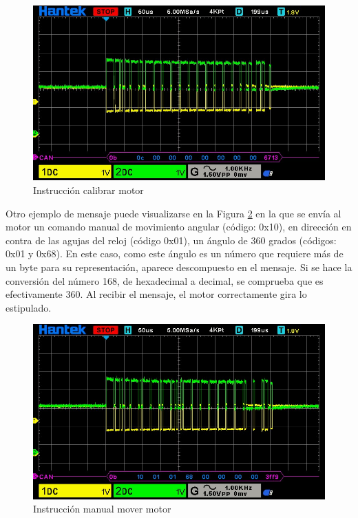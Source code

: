 \begin{figure}[htbp]
	\centering
	\includegraphics[scale=0.6]{./Figures/Motor_Calibrate.jpg}
	\caption{Instrucción calibrar motor}
	\label{fig:mot_calib}
\end{figure}

Otro ejemplo de mensaje puede visualizarse en la Figura \ref{fig:mot_move} en la que se envía al motor un comando manual de movimiento angular (código: 0x10), en dirección en contra de las agujas del reloj (código 0x01), un ángulo de 360 grados (códigos: 0x01 y 0x68). En este caso, como este ángulo es un número que requiere más de un byte para su representación, aparece descompuesto en el mensaje. Si se hace la conversión del número 168, de hexadecimal a decimal, se comprueba que es efectivamente 360. Al recibir el mensaje, el motor correctamente gira lo estipulado.

\begin{figure}[htbp]
	\centering
	\includegraphics[scale=0.6]{./Figures/Motor_Manual_Move_CCW_360DEG.jpg}
	\caption{Instrucción manual mover motor}
	\label{fig:mot_move}
\end{figure}


